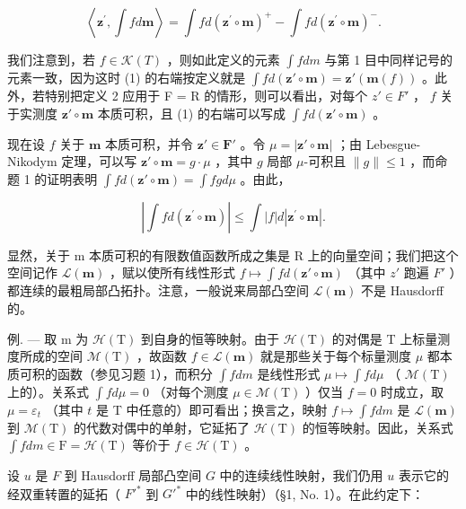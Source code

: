 \[
\left\langle \mathbf {z} ^ {\prime}, \int f d \mathbf {m} \right\rangle = \int f d (\mathbf {z} ^ {\prime} \circ \mathbf {m}) ^ {+} - \int f d (\mathbf {z} ^ {\prime} \circ \mathbf {m}) ^ {-}.\tag{1}
\]

我们注意到，若 \(f \in \mathcal{K}(T)\) ，则如此定义的元素 \(\int f dm\) 与第 1 目中同样记号的元素一致，因为这时 (1) 的右端按定义就是 \(\int f d(\mathbf{z}' \circ \mathbf{m}) = \mathbf{z}'(\mathbf{m}(f))\) 。此外，若特别把定义 2 应用于 F = R 的情形，则可以看出，对每个 \(z' \in F'\) ， \(f\) 关于实测度 \(\mathbf{z}' \circ \mathbf{m}\) 本质可积，且 (1) 的右端可以写成 \(\int f d(\mathbf{z}' \circ \mathbf{m})\) 。

现在设 \(f\) 关于 \(\mathbf{m}\) 本质可积，并令 \(\mathbf{z}' \in \mathbf{F}'\) 。令 \(\mu = |\mathbf{z}' \circ \mathbf{m}|\) ；由 Lebesgue-Nikodym 定理，可以写 \(\mathbf{z}' \circ \mathbf{m} = g \cdot \mu\) ，其中 \(g\) 局部 \(\mu\)-可积且 \(\| g \| \leqslant 1\) ，而命题 1 的证明表明 \(\int f d(\mathbf{z}' \circ \mathbf{m}) = \int fg d\mu\) 。由此，

\[
\left| \int f d (\mathbf {z} ^ {\prime} \circ \mathbf {m}) \right| \leqslant \int | f | d | \mathbf {z} ^ {\prime} \circ \mathbf {m} |.\tag{2}
\]

显然，关于 m 本质可积的有限数值函数所成之集是 R 上的向量空间；我们把这个空间记作 \(\mathcal{L}(\mathbf{m})\) ，赋以使所有线性形式 \(f \mapsto \int f d(\mathbf{z}' \circ \mathbf{m})\) （其中 \(z'\) 跑遍 \(F'\) ）都连续的最粗局部凸拓扑。注意，一般说来局部凸空间 \(\mathcal{L}(\mathbf{m})\) 不是 Hausdorff 的。

例. --- 取 m 为 \(\mathcal{H}(\mathrm{T})\) 到自身的恒等映射。由于 \(\mathcal{H}(\mathrm{T})\) 的对偶是 T 上标量测度所成的空间 \(\mathcal{M}(\mathrm{T})\) ，故函数 \(f \in \mathcal{L}(\mathbf{m})\) 就是那些关于每个标量测度 \(\mu\) 都本质可积的函数（参见习题 1），而积分 \(\int f dm\) 是线性形式 \(\mu \mapsto \int f d\mu\) （ \(\mathcal{M}(\mathrm{T})\) 上的）。关系式 \(\int f d\mu = 0\) （对每个测度 \(\mu \in \mathcal{M}(\mathrm{T})\) ）仅当 \(f = 0\) 时成立，取 \(\mu = \varepsilon_t\) （其中 \(t\) 是 T 中任意的）即可看出；换言之，映射 \(f \mapsto \int f dm\) 是 \(\mathcal{L}(\mathbf{m})\) 到 \(\mathcal{M}(\mathrm{T})\) 的代数对偶中的单射，它延拓了 \(\mathcal{H}(\mathrm{T})\) 的恒等映射。因此，关系式 \(\int f dm \in \mathrm{F} = \mathcal{H}(\mathrm{T})\) 等价于 \(f \in \mathcal{H}(\mathrm{T})\) 。

设 \(u\) 是 \(F\) 到 Hausdorff 局部凸空间 \(G\) 中的连续线性映射，我们仍用 \(u\) 表示它的经双重转置的延拓（ \(F'^*\) 到 \(G'^*\) 中的线性映射）（§1, No. 1）。在此约定下：

